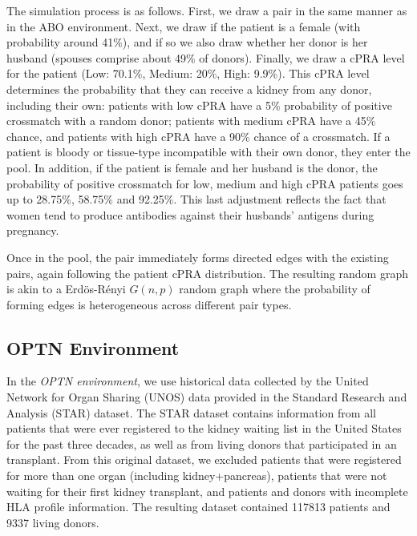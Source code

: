 \documentclass[format=acmsmall, review=false]{acmart}
\begin{document}
The simulation process is as follows. First, we draw a pair in the same manner as in the ABO environment. Next, we draw if the patient is a female (with probability around 41\%), and if so we also draw whether her donor is her husband (spouses comprise about 49\% of donors). Finally, we draw a  cPRA level for the patient (Low: 70.1\%, Medium: 20\%, High: 9.9\%). This cPRA level determines the probability that they can receive a kidney from any donor, including their own: patients with low cPRA have a 5\% probability of positive crossmatch with a random donor; patients with medium cPRA have a 45\% chance, and patients with high cPRA have a 90\% chance of a crossmatch. If a patient is bloody or tissue-type incompatible with their own donor, they enter the pool. In addition, if the patient is female and her husband is the donor, the probability of positive crossmatch for low, medium and high cPRA patients goes up to 28.75\%, 58.75\% and 92.25\%. This last adjustment reflects the fact that women tend to produce antibodies against their husbands' antigens during pregnancy.

Once in the pool, the pair immediately forms directed edges with the existing pairs, again following the patient cPRA distribution. The resulting random graph is akin to a Erd\"{o}s-R\'{e}nyi $G(n,p)$ random graph where the probability of forming edges is heterogeneous across different pair types.

\subsection{OPTN Environment}

In the \emph{OPTN environment}, we use historical data collected by the United Network for Organ Sharing (UNOS) data provided in the Standard Research and Analysis (STAR) dataset. The STAR dataset contains information from all patients that were ever registered to the kidney waiting list in the United States for the past three decades, as well as from living donors that participated in an transplant. From this original dataset, we excluded patients that were registered for more than one organ (including kidney+pancreas), patients that were not waiting for their first kidney transplant, and patients and donors with incomplete HLA profile information. The resulting dataset contained 117813 patients and 9337 living donors.
\end{document}
